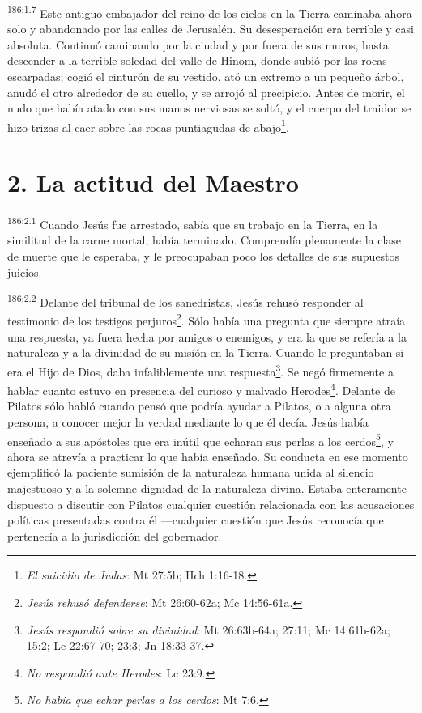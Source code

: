 \par
\textsuperscript{186:1.7} Este antiguo embajador del reino de los cielos en la Tierra caminaba ahora solo y abandonado por las calles de Jerusalén. Su desesperación era terrible y casi absoluta. Continuó caminando por la ciudad y por fuera de sus muros, hasta descender a la terrible soledad del valle de Hinom, donde subió por las rocas escarpadas; cogió el cinturón de su vestido, ató un extremo a un pequeño árbol, anudó el otro alrededor de su cuello, y se arrojó al precipicio. Antes de morir, el nudo que había atado con sus manos nerviosas se soltó, y el cuerpo del traidor se hizo trizas al caer sobre las rocas puntiagudas de abajo\footnote{\textit{El suicidio de Judas}: Mt 27:5b; Hch 1:16-18.}.

\section*{2. La actitud del Maestro}
\par
\textsuperscript{186:2.1} Cuando Jesús fue arrestado, sabía que su trabajo en la Tierra, en la similitud de la carne mortal, había terminado. Comprendía plenamente la clase de muerte que le esperaba, y le preocupaban poco los detalles de sus supuestos juicios.

\par
\textsuperscript{186:2.2} Delante del tribunal de los sanedristas, Jesús rehusó responder al testimonio de los testigos perjuros\footnote{\textit{Jesús rehusó defenderse}: Mt 26:60-62a; Mc 14:56-61a.}. Sólo había una pregunta que siempre atraía una respuesta, ya fuera hecha por amigos o enemigos, y era la que se refería a la naturaleza y a la divinidad de su misión en la Tierra. Cuando le preguntaban si era el Hijo de Dios, daba infaliblemente una respuesta\footnote{\textit{Jesús respondió sobre su divinidad}: Mt 26:63b-64a; 27:11; Mc 14:61b-62a; 15:2; Lc 22:67-70; 23:3; Jn 18:33-37.}. Se negó firmemente a hablar cuanto estuvo en presencia del curioso y malvado Herodes\footnote{\textit{No respondió ante Herodes}: Lc 23:9.}. Delante de Pilatos sólo habló cuando pensó que podría ayudar a Pilatos, o a alguna otra persona, a conocer mejor la verdad mediante lo que él decía. Jesús había enseñado a sus apóstoles que era inútil que echaran sus perlas a los cerdos\footnote{\textit{No había que echar perlas a los cerdos}: Mt 7:6.}, y ahora se atrevía a practicar lo que había enseñado. Su conducta en ese momento ejemplificó la paciente sumisión de la naturaleza humana unida al silencio majestuoso y a la solemne dignidad de la naturaleza divina. Estaba enteramente dispuesto a discutir con Pilatos cualquier cuestión relacionada con las acusaciones políticas presentadas contra él ---cualquier cuestión que Jesús reconocía que pertenecía a la jurisdicción del gobernador.

